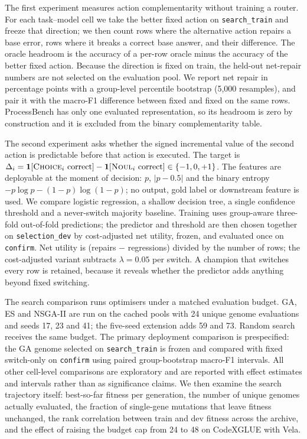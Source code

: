 The first experiment measures action complementarity without training a router. For each
task--model cell we take the better fixed action on \texttt{search\_train} and
freeze that direction; we then count rows where the alternative action repairs a
base error, rows where it breaks a correct base answer, and their difference.
The oracle headroom is the accuracy of a per-row oracle minus the accuracy of
the better fixed action. Because the direction is fixed on train, the held-out
net-repair numbers are not selected on the evaluation pool. We report net repair
in percentage points with a group-level percentile bootstrap (5{,}000
resamples), and pair it with the macro-F1 difference between fixed \choice{} and
fixed \noul{} on the same rows. ProcessBench has only one evaluated
representation, so its headroom is zero by construction and it is excluded from
the binary complementarity table.

The second experiment asks whether the signed incremental value of the second
action is predictable before that action is executed. The target is
$\Delta_i=\mathbf{1}[\textsc{Choice}_i\text{ correct}]-
\mathbf{1}[\textsc{Noul}_i\text{ correct}]\in\{-1,0,+1\}$. The features are deployable at the
moment of decision: $p$, $|p-0.5|$ and the binary entropy $-p\log p -
(1-p)\log(1-p)$; no \choice{} output, gold label or downstream feature is used.
We compare logistic regression, a shallow decision tree, a single confidence
threshold and a never-switch majority baseline. Training uses group-aware
three-fold out-of-fold predictions; the predictor and threshold are then chosen
together on \texttt{selection\_dev} by cost-adjusted net utility, frozen, and
evaluated once on \texttt{confirm}. Net utility is (repairs $-$ regressions)
divided by the number of rows; the cost-adjusted variant subtracts
$\lambda=0.05$ per switch. A champion that switches every row is retained, because it reveals
whether the predictor adds anything beyond fixed switching.

The search comparison runs optimisers under a matched evaluation budget. GA, ES and NSGA-II
are run on the cached pools with 24 unique genome evaluations and seeds 17, 23
and 41; the five-seed extension adds 59 and 73. Random search receives the same
budget. The primary deployment comparison is prespecified: the GA genome
selected on \texttt{search\_train} is frozen and compared with fixed
switch-only on \texttt{confirm} using paired group-bootstrap macro-F1 intervals.
All other cell-level comparisons are exploratory and are reported with effect
estimates and intervals rather than as significance claims. We then examine the
search trajectory itself: best-so-far fitness per generation, the number of
unique genomes actually evaluated, the fraction of single-gene mutations that
leave fitness unchanged, the rank correlation between train and dev fitness
across the archive, and the effect of raising the budget cap from 24 to 48 on
CodeXGLUE with Vela.

